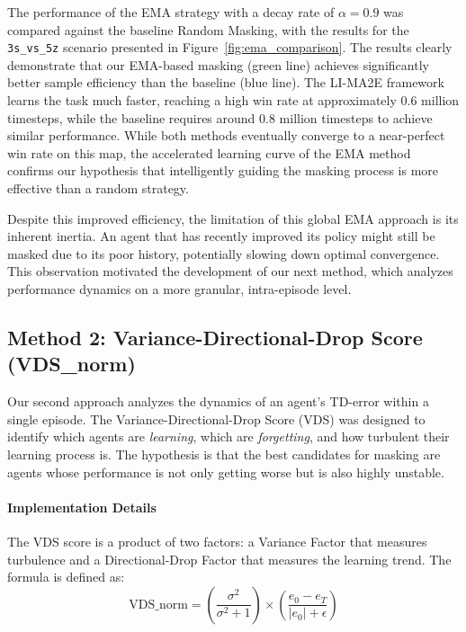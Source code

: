 The performance of the EMA strategy with a decay rate of $\alpha=0.9$ was compared against the baseline Random Masking, with the results for the \texttt{3s\_vs\_5z} scenario presented in Figure~\ref{fig:ema_comparison}.
The results clearly demonstrate that our EMA-based masking (green line) achieves significantly better sample efficiency than the baseline (blue line). The LI-MA2E framework learns the task much faster, reaching a high win rate at approximately 0.6 million timesteps, while the baseline requires around 0.8 million timesteps to achieve similar performance. While both methods eventually converge to a near-perfect win rate on this map, the accelerated learning curve of the EMA method confirms our hypothesis that intelligently guiding the masking process is more effective than a random strategy.

Despite this improved efficiency, the limitation of this global EMA approach is its inherent inertia. An agent that has recently improved its policy might still be masked due to its poor history, potentially slowing down optimal convergence. This observation motivated the development of our next method, which analyzes performance dynamics on a more granular, intra-episode level.

\subsection{Method 2: Variance-Directional-Drop Score (VDS\_norm)}
\label{subsec:vds_method}

Our second approach analyzes the dynamics of an agent's TD-error within a single episode. The Variance-Directional-Drop Score (VDS) was designed to identify which agents are \textit{learning}, which are \textit{forgetting}, and how turbulent their learning process is. The hypothesis is that the best candidates for masking are agents whose performance is not only getting worse but is also highly unstable.

\paragraph{Implementation Details}
The VDS score is a product of two factors: a Variance Factor that measures turbulence and a Directional-Drop Factor that measures the learning trend. The formula is defined as:
\begin{equation}
    \text{VDS\_norm} = \left(\frac{\sigma^2}{\sigma^2 + 1}\right) \times \left(\frac{e_0 - e_T}{|e_0| + \epsilon}\right)
\label{eq:vds}
\end{equation}

